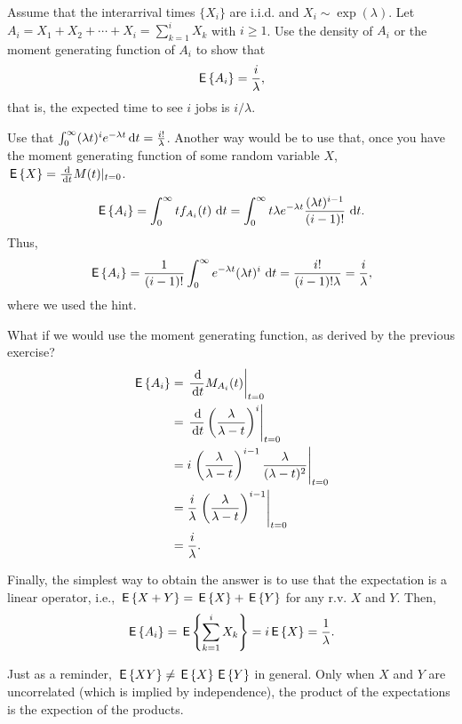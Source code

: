   \begin{exercise}
    Assume that the interarrival times $\{X_i\}$ are i.i.d. and
    $X_i\sim\exp(\lambda)$. Let
    $A_i=X_1+X_2+\cdots+X_i=\sum_{k=1}^i X_k$ with $i\geq 1$. Use the
    density of $A_i$ or the moment generating function of $A_i$ to
    show that
 \begin{equation*}
\,\mathsf{E}\left\{A_i\right\} = \frac i\lambda,
 \end{equation*}
 that is, the expected time to see $i$ jobs is $i/\lambda$.
 \begin{hint}
Use that
    $\int_0^\infty (\lambda t)^i e^{- \lambda t} \,\text{d}t =
    \frac{i!}\lambda$.
    Another way would be to use that, once you have the moment
    generating function of some random variable $X$,
    $\E X = \frac{\d}{\d t} M(t) |_{t=0}$. 
 \end{hint}
  \begin{solution}
  \begin{equation*}
\,\mathsf{E}\left\{A_i\right\} = \int_0^\infty t f_{A_i} (t) \, \,\text{d}t  = 
\int_0^\infty t  \lambda e^{-\lambda t} \frac{(\lambda t)^{i-1}}{(i-1)!}\, \,\text{d}t.
  \end{equation*}
Thus, 
  \begin{equation*}
\,\mathsf{E}\left\{A_i\right\} = \frac{1}{(i-1)!} \int_0^\infty   e^{-\lambda t} (\lambda t)^i\,\,\text{d}t = \frac{i!}{(i-1)!\lambda}=\frac{i}\lambda,
  \end{equation*}
  where we used the hint.

What if we would use the moment generating function, as derived by the previous exercise?
\begin{equation*}
  \begin{split}
    \E{A_i} 
&= \left.\frac{\d}{\d t} M_{A_i}(t)\right|_{t=0} \\
&= \left.\frac{\d}{\d t} \left(\frac{\lambda}{\lambda-t}\right)^i\right|_{t=0} \\
&= i \left.\left(\frac{\lambda}{\lambda-t}\right)^{i-1}\frac{\lambda}{(\lambda-t)^2}\right|_{t=0} \\
&= \frac i\lambda \left.\left(\frac{\lambda}{\lambda-t}\right)^{i-1}\right|_{t=0} \\
&= \frac i\lambda.
  \end{split}
\end{equation*}

Finally, the simplest way to obtain the answer is to use that the expectation is a linear operator, i.e., $\,\mathsf{E}\left\{X+Y\right\}= \,\mathsf{E}\left\{X\right\} + \,\mathsf{E}\left\{Y\right\}$ for any r.v. $X$ and $Y$. Then,
\begin{equation*}
\,\mathsf{E}\left\{A_i\right\} = \,\mathsf{E}\left\{\sum_{k=1}^i X_k\right\} = i \,\mathsf{E}\left\{X\right\} = \frac 1 \lambda.
\end{equation*}

Just as a reminder, $\,\mathsf{E}\left\{XY\right\} \neq \,\mathsf{E}\left\{X\right\} \,\mathsf{E}\left\{Y\right\}$ in general. Only when $X$ and $Y$ are uncorrelated (which is implied by independence), the product of the expectations is the expection of the products.
  \end{solution}
\end{exercise}

